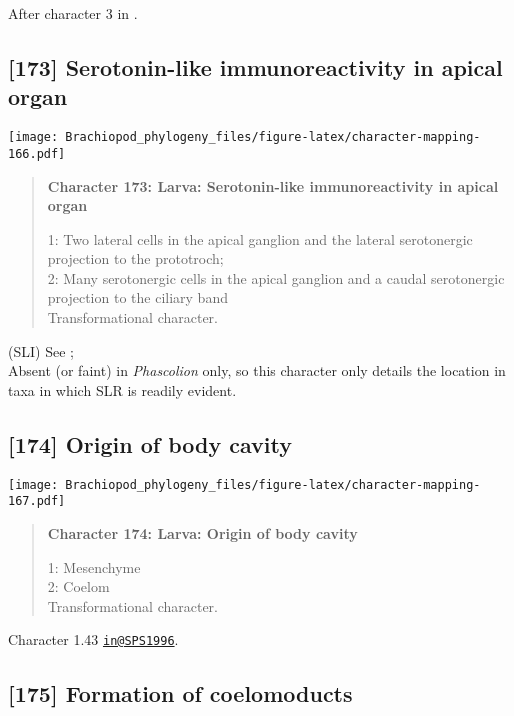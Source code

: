 \documentclass[openany]{book}
\theoremstyle{definition}
\theoremstyle{definition}
\theoremstyle{definition}
\theoremstyle{remark}
\begin{document}
After character 3 in \citet{Richter2010}.

\subsection*{{[}173{]} Serotonin-like immunoreactivity in apical
organ}\label{serotonin-like-immunoreactivity-in-apical-organ}

\texttt{[image: Brachiopod\_phylogeny\_files/figure-latex/character-mapping-166.pdf]}

\begin{quote}
\textbf{Character 173: Larva: Serotonin-like immunoreactivity in apical
organ}

1: Two lateral cells in the apical ganglion and the lateral serotonergic
projection to the prototroch;\\
2: Many serotonergic cells in the apical ganglion and a caudal
serotonergic projection to the ciliary band\\
Transformational character.
\end{quote}

(SLI) See \citet{Haszprunar2000}; \citet{Richter2010}\\
Absent (or faint) in \emph{Phascolion} only, so this character only
details the location in taxa in which SLR is readily evident.

\subsection*{{[}174{]} Origin of body
cavity}\label{origin-of-body-cavity}

\texttt{[image: Brachiopod\_phylogeny\_files/figure-latex/character-mapping-167.pdf]}

\begin{quote}
\textbf{Character 174: Larva: Origin of body cavity}

1: Mesenchyme\\
2: Coelom\\
Transformational character.
\end{quote}

Character 1.43 \href{mailto:in@SPS1996}{\nolinkurl{in@SPS1996}}.

\subsection*{{[}175{]} Formation of
coelomoducts}\label{formation-of-coelomoducts}
\end{document}

